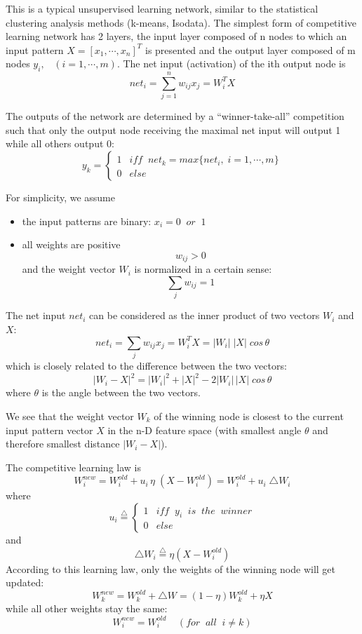 This is a typical unsupervised learning network, similar to the statistical
clustering analysis methods (k-means, Isodata). The simplest form of 
competitive learning network has 2 layers, the input layer composed of n
nodes to which an input pattern $X=[x_1,\cdots,x_n]^T$ is presented and the 
output layer composed of m nodes $y_i,\;\;\;(i=1,\cdots,m)$. The net input
(activation) of the ith output node is
\[	net_i=\sum_{j=1}^n w_{ij} x_j=W_i^TX	\]

The outputs of the network are determined by a ``winner-take-all'' competition
such that only the output node receiving the maximal net input will output
1 while all others output 0:
\[y_k=\left\{ \begin{array}{ll} 1 & iff\;\;net_k=max\{net_i,\;i=1,\cdots,m\} \\
				0 & else
	\end{array} \right.
\]

For simplicity, we assume 
\begin{itemize}
	\item the input patterns are binary: $x_i=0\;\;or\;\;1$
	\item all weights are positive
		\[ w_{ij}>0	\]
	 and the weight vector $W_i$ is normalized in a certain sense:
		\[ \sum_j w_{ij}=1	\]
\end{itemize}

The net input $net_i$ can be considered as the inner product of two vectors 
$W_i$ and $X$:
\[	net_i=\sum_j w_{ij} x_j=W_i^TX=|W_i|\;|X|\;cos\,\theta	\]
which is closely related to the difference between the two vectors:
\[	|W_i-X|^2=|W_i|^2+|X|^2-2|W_i|\,|X|\;cos\,\theta	\]
where $\theta$ is the angle between the two vectors.

We see that the weight vector $W_k$ of the winning node is closest to the 
current input pattern vector $X$ in the n-D feature space (with smallest angle
$\theta$ and therefore smallest distance $|W_i-X|$).


The competitive learning law is
\[ W_i^{new}=W_i^{old}+u_i\,\eta\;(X-W_i^{old})
	=W_i^{old}+u_i\;\triangle W_i \]
where
\[ u_i\stackrel{\triangle}{=}\left\{ \begin{array}{ll} 
	1 & iff\;\;y_i\;\;is\;\;the\;\;winner\\ 0 & else
	\end{array} \right.
\]
and
\[	\triangle W_i\stackrel{\triangle}{=}\eta(X-W_i^{old})	\]
According to this learning law, only the weights of the winning node will get
updated:
\[	W_k^{new}=W_k^{old}+\triangle W=(1-\eta)W_k^{old}+\eta X	\]
while all other weights stay the same:
\[	W_i^{new}=W_i^{old}\;\;\;\;(for\;\;all\;\;i\neq k) \]

